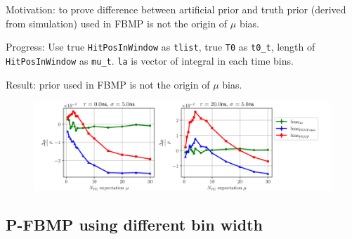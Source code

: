 \documentclass[notitlepage]{article}
\begin{document}
Motivation: to prove difference between artificial prior and truth prior (derived from simulation) used in FBMP is not the origin of $\mu$ bias. 

Progress: Use true \texttt{HitPosInWindow} as \texttt{tlist}, true \texttt{T0} as \texttt{t0\_t}, length of \texttt{HitPosInWindow} as \texttt{mu\_t}. \texttt{la} is vector of integral in each time bins. 

Result: prior used in FBMP is not the origin of $\mu$ bias. 

\begin{figure}[H]
    \includegraphics[width=\textwidth]{vs-biasmu-truprior.png}
\end{figure}

\subsection{P-FBMP using different bin width}
\end{document}
